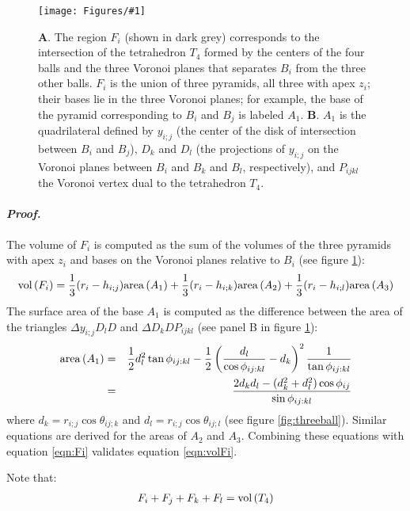 \documentclass[11 pt]{article}
\newcommand {\mm}[1] {\ifmmode{#1}\else{\mbox{\(#1\)}}\fi}
\theoremstyle{plain} \theorembodyfont{\rmfamily}
\newcommand{\Volume}[1]     {\mm{\rm vol\,}{#1}}
\newcommand{\Area}[1]       {\mm{\rm area\,}{#1}}
\newcommand{\centerfig}[2]{%
\centerline{\texttt{[image: Figures/\#1]}}
}
\begin{document}
\begin{figure}[hbt]
      \centerfig{FourBallVol}{width=4.5in}
\caption{ \textbf{A}. The region $F_i$ (shown in dark grey) corresponds to the intersection of the tetrahedron $T_4$ formed by the centers of the four balls and the three Voronoi planes that separates $B_i$ from the three other balls. $F_i$ is the union of three pyramids, all three with apex $z_i$; their bases lie in the three Voronoi planes; for example, the base of the pyramid corresponding to $B_i$ and $B_j$ is labeled $A_1$. \textbf{B}. $A_1$ is the quadrilateral defined by $y_{i;j}$ (the center of the disk of intersection between $B_i$ and $B_j$), $D_k$ and $D_l$ (the projections of $y_{i;j}$ on the Voronoi planes between $B_i$ and $B_k$ and $B_l$, respectively), and $P_{ijkl}$ the Voronoi vertex dual to the tetrahedron $T_4$. }
   \label{fig:FourBall}
\end{figure}

 \paragraph{\emph{Proof.}} 

 The volume of $F_i$ is computed as the sum of the volumes of the three pyramids with apex $z_i$ and bases on the Voronoi planes relative to $B_i$ (see figure \ref{fig:FourBall}):
 \begin{eqnarray}
 \Volume{(F_i)} = \frac{1}{3} (r_i - h_{i;j}) \Area{(A_1)}  + \frac{1}{3} (r_i - h_{i;k}) \Area{(A_2)}  + \frac{1}{3} (r_i - h_{i;l}) \Area{(A_3)} 
 \label{eqn:Fi}
 \end{eqnarray}
 The surface area of the base $A_1$ is computed as the difference between the area of the triangles $\Delta y_{i;j}D_l D$ and $\Delta D_k D P_{ijkl}$ (see panel B in figure \ref{fig:FourBall}):
 \begin{eqnarray}
 \Area{(A_1}) &=& \frac{1}{2} d_l^2 \tan{ \phi_{ij:kl}} - \frac{1}{2} \left( \frac{d_l}{\cos{\phi_{ij:kl}}} - d_k\right)^2 \frac{1}{\tan{\phi_{ij:kl}}} \nonumber \\
 &=& \frac{2d_k d_l - (d_k^2+d_l^2) \cos{\phi_{ij}}}{\sin{\phi_{ij:kl}}} 
 \end{eqnarray}
 where $d_k = r_{i;j} \cos{\theta_{ij;k}}$ and $d_l = r_{i;j} \cos{\theta_{ij;l}}$ (see figure \ref{fig:threeball}).
 Similar equations are derived for the areas of $A_2$ and $A_3$. Combining these equations with equation 
 \ref{eqn:Fi} validates equation \ref{eqn:volFi}. 
 
 Note that:
\begin{eqnarray}
F_i + F_j + F_k + F_l = \Volume{(T_4)}
\end{eqnarray}
\end{document}
